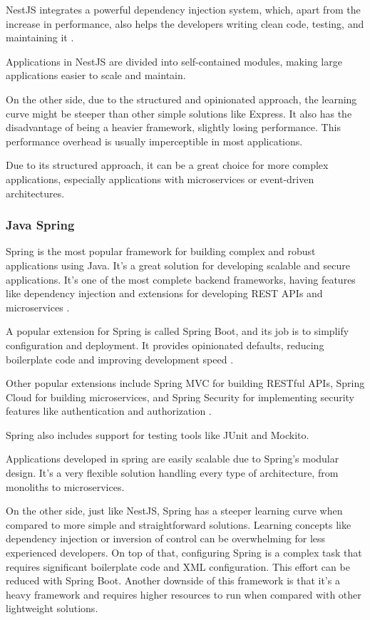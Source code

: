 NestJS integrates a powerful dependency injection system, which, apart from the
increase in performance, also helps the developers writing clean code, testing,
and maintaining it \cite{nestJS}.

Applications in NestJS are divided into
self-contained modules, making large applications easier to scale and maintain.

On the other side, due to the structured and opinionated approach, the learning
curve might be steeper than other simple solutions like Express.
It also has the disadvantage of being a heavier framework, slightly losing
performance. This performance overhead is usually imperceptible in most
applications.

Due to its structured approach, it can be a great choice for more complex
applications, especially applications with microservices or event-driven
architectures.
\subsubsection{Java Spring}
Spring is the most popular framework for building complex and robust
applications using Java. It's a great solution for developing scalable and secure
applications. It's one of the most complete backend frameworks, having features
like dependency injection and extensions for developing \gls{REST} \gls{API}s and
microservices \cite{GFGJava}.

A popular extension for Spring is called Spring Boot, and its job is to
simplify configuration and deployment. It provides opinionated defaults,
reducing boilerplate code and improving development speed \cite{GFGJava}.

Other popular extensions include Spring \gls{MVC} for building \gls{REST}ful \gls{API}s, Spring
Cloud for building microservices, and Spring Security for implementing
security features like authentication and authorization \cite{GFGJava}.

Spring also includes support for testing tools like JUnit and Mockito.

Applications developed in spring are easily scalable due to Spring's modular
design.
It's a very flexible solution handling every type of architecture, from
monoliths to microservices.

On the other side, just like NestJS, Spring has a steeper learning curve when
compared to more simple and straightforward solutions. Learning concepts like
dependency injection or inversion of control can be overwhelming for less
experienced developers.
On top of that, configuring Spring is a complex task that requires significant
boilerplate code and \gls{XML} configuration. This effort can be reduced with Spring
Boot.
Another downside of this framework is that it's a heavy framework and
requires higher resources to run when compared with other lightweight solutions.

